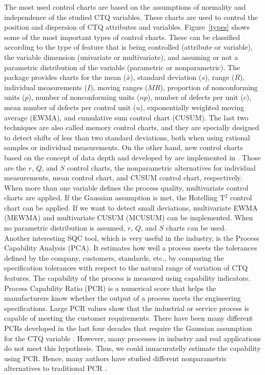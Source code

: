 The most used control charts are based on the assumptions of normality and independence of the studied CTQ variables. These charts are used to control the position and dispersion of CTQ attributes and variables. Figure~\ref{types} shows some of the most important types of control charts. These can be classified according to the type of feature that is being controlled (attribute or variable), the variable dimension (univariate or multivariate), and assuming or not a parametric distribution of the variable (parametric or nonparametric). The  package provides charts for the mean ($\bar{x}$), standard deviation ($s$), range ($R$), individual measurements ($I$), moving ranges ($MR$), proportion of nonconforming units ($p$), number of nonconforming units ($np$), number of defects per unit ($c$), mean number of defects per control unit ($u$), exponentially weighted moving average (EWMA), and cumulative sum control chart (CUSUM). The last two techniques are also called memory control charts, and they are specially designed to detect shifts of less than two standard deviations, both when using rational samples or individual measurements. 
On the other hand, new control charts based on the concept of data depth and developed by \cite{liu1995control} are implemented in . Those are the $r$, $Q$, and $S$ control charts, the nonparametric alternatives for individual measurements, mean control chart, and CUSUM control chart, respectively. When more than one variable defines the process quality, multivariate control charts are applied. If the Gaussian assumption is met, the Hotelling T$^2$ control chart can be applied. If we want to detect small deviations, multivariate EWMA (MEWMA) and multivariate CUSUM (MCUSUM) can be implemented. When no parametric distribution is assumed, $r$, $Q$, and $S$ charts can be used.  
\\

Another interesting SQC tool, which is very useful in the industry, is the Process Capability Analysis (PCA).
It estimates how well a process meets the tolerances defined by the company, customers, standards, etc., by comparing the specification tolerances with respect to the natural range of variation of CTQ features. The capability of the process is measured using capability indicators. Process Capability Ratio (PCR) is a numerical score that helps the manufacturers know whether the output of a process meets the engineering specifications. Large PCR values show that the industrial or service process is capable of meeting the customer requirements. There have been many different PCRs developed in the last four decades that require the Gaussian assumption for the CTQ variable \citep{boyles1991taguchi}.
However, many processes in industry and real applications do not meet this hypothesis. Thus, we could innacuratelly estimate the capability using PCR. Hence, many authors have studied different nonparametric alternatives to traditional PCR \citep{polansky2007process}. \\

